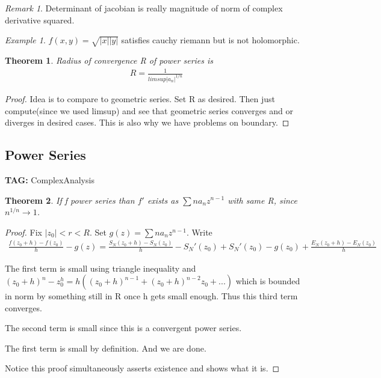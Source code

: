 \documentclass[11pt]{article}
\newtheorem{theorem}{Theorem}
\theoremstyle{remark}
\newtheorem{remark}{Remark}
\newtheorem{example}{Example}
\begin{document}
\begin{remark}
	Determinant of jacobian is really magnitude of norm of complex derivative squared.
\end{remark}

\begin{example}
	$f(x,y) = \sqrt{|x||y|}$ satisfies cauchy riemann but is  not holomorphic. 
\end{example}

\begin{theorem}
	Radius of convergence R of power series is
	\begin{align*}
		R = \frac{1}{limsup |a_n|^{1/n}}
	\end{align*}
\end{theorem}

\begin{proof}
	Idea is to compare to geometric series. Set R as desired. Then just compute(since we used limsup) and see that geometric series converges and or diverges in desired cases. This is also why we have problems on boundary. 
\end{proof}

\subsection{Power Series}

\textbf{TAG:} ComplexAnalysis

\begin{theorem}
	If f power series than $f'$ exists as $\sum n a_n z^{n-1}$ with same R, since $n^{1/n} \to 1$. 
\end{theorem}

\begin{proof}
	Fix $|z_0| < r < R$. Set $g(z) = \sum na_nz^{n-1}$. Write
	\begin{align*}
		\frac{f(z_0+h)-f(z_0)}{h} - g(z) = \frac{S_N(z_0+h)-S_N(z_0)}{h} - S_N'(z_0) + S_N'(z_0)-g(z_0) + \frac{E_N(z_0+h) - E_N(z_0)}{h}
	\end{align*}

	The first term is small using triangle inequality and $(z_0 + h)^n - z_0^h = h((z_0+h)^{n-1}+(z_0+h)^{n-2}z_0 + ...)$ which is bounded in norm by something still in R once h gets small enough. Thus this third term converges.

	The second term is small since this is a convergent power series.

	The first term is small by definition. And we are done.

	Notice this proof simultaneously asserts existence and shows what it is.
\end{proof}
\end{document}
